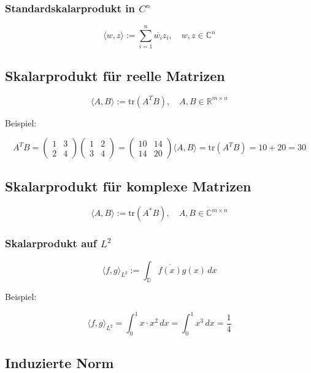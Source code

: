 \documentclass[9pt,a4paper]{article}
\begin{document}
    \subsubsection{Standardskalarprodukt in $C^n$}
    $$\langle w, z \rangle := \sum_{i=1}^{n} \overline{w_i} z_i, \quad w, z \in \mathbb{C}^n$$
    
    \subsection{Skalarprodukt für reelle Matrizen}
    $$\langle A, B \rangle := \text{tr}(A^T B), \quad A, B \in \mathbb{R}^{m \times n}$$
    
    Beispiel:
    
    $$A^T B = \begin{pmatrix} 1 & 3 \\ 2 & 4 \end{pmatrix} \begin{pmatrix} 1 & 2 \\ 3 & 4 \end{pmatrix}
    = \begin{pmatrix} 10 & 14 \\ 14 & 20 \end{pmatrix}
    \langle A, B \rangle = \text{tr}(A^T B) = 10 + 20 = 30$$
    
    \subsection{Skalarprodukt für komplexe Matrizen}
    $$\langle A, B \rangle := \text{tr}(A^* B), \quad A, B \in \mathbb{C}^{m \times n}$$
    
    \subsubsection{Skalarprodukt auf $L^2$}
    $$\langle f, g \rangle_{L^2} := \int_{\mathbb{D}} \overline{f(x)} g(x) \, dx$$
    
    Beispiel:
    
    $$\langle f, g \rangle_{L^2} = \int_0^1 x \cdot x^2 \, dx = \int_0^1 x^3 \, dx = \frac{1}{4}$$
    
    \subsection{Induzierte Norm}
    
\end{document}

